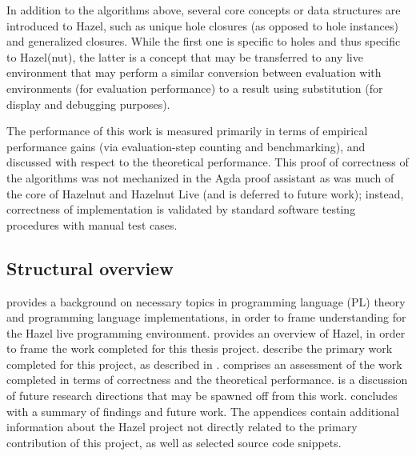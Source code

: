 In addition to the algorithms above, several core concepts or data structures are introduced to Hazel, such as unique hole closures (as opposed to hole instances) and generalized closures. While the first one is specific to holes and thus specific to Hazel(nut), the latter is a concept that may be transferred to any live environment that may perform a similar conversion between evaluation with environments (for evaluation performance) to a result using substitution (for display and debugging purposes).

The performance of this work is measured primarily in terms of empirical performance gains (via evaluation-step counting and benchmarking), and discussed with respect to the theoretical performance. This proof of correctness of the algorithms was not mechanized in the Agda proof assistant as was much of the core of Hazelnut and Hazelnut Live (and is deferred to future work); instead, correctness of implementation is validated by standard software testing procedures with manual test cases.

\subsection{Structural overview}
\label{sec:structural_overview}

 provides a background on necessary topics in programming language (PL) theory and programming language implementations, in order to frame understanding for the Hazel live programming environment.  provides an overview of Hazel, in order to frame the work completed for this thesis project.  describe the primary work completed for this project, as described in .  comprises an assessment of the work completed in terms of correctness and the theoretical performance.  is a discussion of future research directions that may be spawned off from this work.  concludes with a summary of findings and future work. The appendices contain additional information about the Hazel project not directly related to the primary contribution of this project, as well as selected source code snippets.

